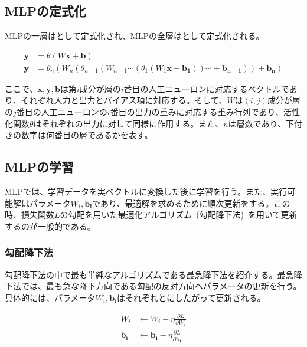 \subsection{MLPの定式化}

MLPの一層はとして定式化され、MLPの全層はとして定式化される。

\begin{align}
    \label{eq:MLP0_1}
    \boldsymbol{y}&=\theta(W\boldsymbol{x}+\boldsymbol{b})\\
    \label{eq:MLP0_2}
    \boldsymbol{y}&=\theta_{n}(W_{n}(\theta_{n-1}(W_{n-1}\cdots(\theta_{1}(W_{1}\boldsymbol{x}+\boldsymbol{b_{1}}))\cdots+\boldsymbol{b_{n-1}}))+\boldsymbol{b_{n}})
\end{align}

\clearpage

ここで、$\boldsymbol{x},\boldsymbol{y},\boldsymbol{b}$は第$i$成分が層の$i$番目の人工ニューロンに対応するベクトルであり、それぞれ入力と出力とバイアス項に対応する。そして、$W$は$(i,j)$成分が層の$j$番目の人工ニューロンの$i$番目の出力の重みに対応する重み行列であり、活性化関数$\theta$はそれぞれの出力に対して同様に作用する。また、$n$は層数であり、下付きの数字は何番目の層であるかを表す。

\subsection{MLPの学習}

MLPでは、学習データを実ベクトルに変換した後に学習を行う。また、実行可能解はパラメータ$W_i,\boldsymbol{b_i}$であり、最適解を求めるために順次更新をする。この時、損失関数$L$の勾配を用いた最適化アルゴリズム~(勾配降下法)~を用いて更新するのが一般的である。

\subsubsection{勾配降下法}
\label{sec:grad}

勾配降下法の中で最も単純なアルゴリズムである最急降下法を紹介する。最急降下法では、最も急な降下方向である勾配の反対方向へパラメータの更新を行う。具体的には、パラメータ$W_i,\boldsymbol{b_i}$はそれぞれとにしたがって更新される。

\begin{align}
    \label{eq:MLP2_0}
    W _i &\leftarrow W_i - \eta \frac{\partial L}{\partial W_i} \\
    \label{eq:MLP2_1}
    \boldsymbol{b _i} &\leftarrow \boldsymbol{b_i} - \eta \frac{\partial L}{\partial \boldsymbol{b_i}}
\end{align}

